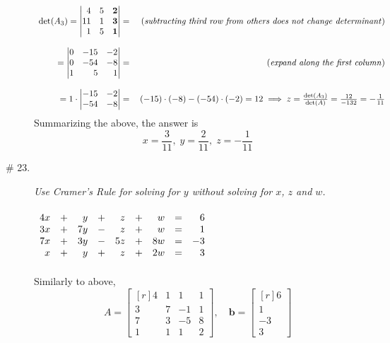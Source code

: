 \documentclass[8pt]{article} %
\begin{document}
\begin{description}
{			\[\begin{array}{rr}
			\det(A_3)=\begin{vmatrix*}[r]4&5&\mathbf{2}\\11&1&\mathbf{3}\\1&5&\mathbf{1}\end{vmatrix*}
			= &\mbox{ (\textit{subtracting third row from others does not change determinant})}\\\\
			=\begin{vmatrix*}[r]0&-15&{-2}\\0&-54&{-8}\\1&5&{1}\end{vmatrix*}
			= &\mbox{ (\textit{expand along the first column})}\\\\
			=1\cdot
			\begin{vmatrix*}[r]-15&-2\\-54&-8\end{vmatrix*}=&(-15)\cdot(-8)-(-54)\cdot(-2)=12\implies z=\frac{\det(A_3)}{\det(A)}=
				\frac{12}{-132}=-\frac{1}{11}
			\end{array}\]
			Summarizing the above, the answer is
			\[x=\frac{3}{11},\;y=\frac{2}{11},\;z=-\frac{1}{11}\]
		}
	\item[\# 23.]{{\it Use Cramer's Rule for solving for $y$ without solving for $x$, $z$ and $w$.\\\\
			$\begin{array}[t]{rrrrrrrrr}
				4x & + {} & y & + {} & z & + {} & w & = & 6\\
				3x & + {} & 7y & - {} & z & + {} & w & = & 1\\
				7x & + {} & 3y & - {} & 5z & + {} & 8w & = & -3\\
				x & + {} & y & + {} & z & + {} & 2w & = & 3
			\end{array}$\\\\}
			Similarly to above,
			\[A=\begin{bmatrix*}[r]4&1&1&1\\3&7&-1&1\\7&3&-5&8\\1&1&1&2\end{bmatrix*},\quad\mathbf{b}=\begin{bmatrix*}[r]6\\1\\-3\\3
			\end{bmatrix*}\]
}
\end{description}
\end{document}
